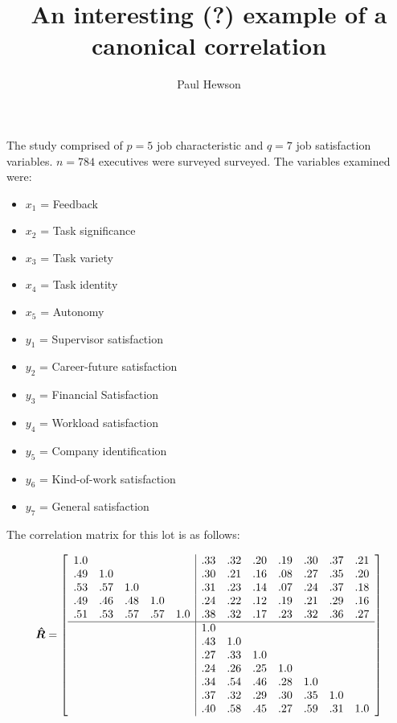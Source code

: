 \documentclass[11pt]{article}
\author{Paul Hewson}
\title{An interesting (?) example of a canonical correlation}
\date{}
\begin{document}
\setlength{\parindent}{0pt}
\setlength{\parskip}{12pt}
\sffamily

\maketitle

The study comprised of $p=5$ job characteristic and $q=7$ job satisfaction variables.   $n=784$ executives were surveyed surveyed.   The variables examined were:
  
  \begin{itemize}
\item  $x_{1}$ = Feedback
\item  $x_{2}$ = Task significance
\item $x_{3}$ = Task variety
\item $x_{4}$ = Task identity
\item $x_{5}$ = Autonomy
   \end{itemize}
   
  \begin{itemize}
\item  $y_{1}$ = Supervisor satisfaction
\item  $y_{2}$ = Career-future satisfaction
\item $y_{3}$ = Financial Satisfaction
\item $y_{4}$ = Workload satisfaction
\item $y_{5}$ = Company identification
\item $y_{6}$ = Kind-of-work satisfaction
\item $y_{7}$ = General satisfaction
   \end{itemize}  



The correlation matrix for this lot is as follows:

\begin{displaymath}
\boldsymbol{\hat{R}} = \left[ \begin{array}{rrrrr|rrrrrrr}
1.0 & & & & & .33 & .32 & .20 & .19 & .30 & .37 & .21 \\
.49 & 1.0 & & & & .30 & .21 & .16 & .08 & .27 & .35 & .20 \\
.53 & .57 & 1.0 & & & .31 & .23 & .14 & .07 & .24 & .37 & .18 \\
.49 & .46 & .48 & 1.0 & & .24 & .22 & .12 & .19 & .21 & .29 & .16 \\
.51 & .53 & .57 & .57 & 1.0 & .38 & .32 & .17 & .23 & .32 & .36 & .27 \\
\hline
 & & & & & 1.0 & & & & & & \\
 & & & & & .43 & 1.0 & & & & & \\
 & & & & & .27 & .33 & 1.0 & & & &\\
 & & & & & .24 & .26 & .25 & 1.0 & & & \\
 & & & & & .34 & .54 & .46 & .28 & 1.0 & & \\
 & & & & & .37 & .32 & .29 & .30 & .35 & 1.0 & \\
 & & & & & .40 & .58 & .45 & .27 & .59 & .31 & 1.0\\
 \end{array} \right]
 \end{displaymath}
\end{document}

